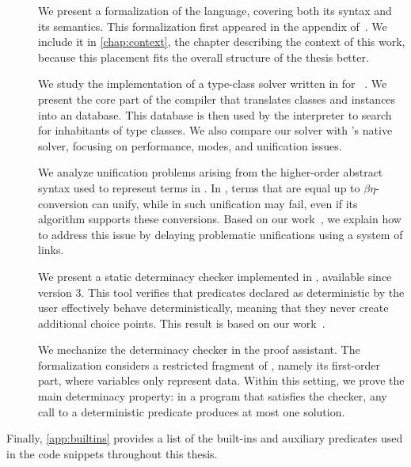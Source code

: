 \begin{description}
  \item [] We present a formalization
            of the \elpi language, covering both its syntax and its semantics.
            This formalization first appeared in the appendix
            of~\cite{fissore2026}. We include it in \cref{chap:context}, the
            chapter describing the context of this work, because this
            placement fits the overall structure of the thesis better.

  \item[] We study the implementation of a type-class solver
                        written in \elpi for \rocq~\cite{fissore2023}. We present the core part of
                        the compiler that translates \rocq classes and
                        instances into an \elpi database. This database is then
                        used by the interpreter to search for inhabitants of
                        type classes. We also compare our solver with \rocq's
                        native solver, focusing on performance, modes, and
                        unification issues.

  \item[] We analyze unification problems arising from
                the higher-order abstract syntax used to represent \rocq terms
                in \elpi. In \rocq, terms that are equal up to
                $\beta\eta$-conversion can unify, while in \elpi such
                unification may fail, even if its algorithm supports these
                conversions. Based on our work~\cite{fissore2024}, we explain how
                to address this issue by delaying problematic unifications using
                a system of links.

  \item[] We present a static determinacy checker
               implemented in \elpi, available since version 3. This tool
               verifies that predicates declared as deterministic by the user
               effectively behave deterministically, meaning that they never
               create additional choice points. This result is based on our
               work~\cite{fissore2026}.

  \item[] We mechanize the determinacy checker in the
               \rocq proof assistant. The formalization considers a restricted
               fragment of \elpi, namely its first-order part, where variables
               only represent data. Within this setting, we prove the main
               determinacy property: in a program that satisfies the checker,
               any call to a deterministic predicate produces at most one
               solution.
\end{description}

Finally, \cref{app:builtins} provides a list of the \elpi built-ins and auxiliary
predicates used in the code snippets throughout this thesis.